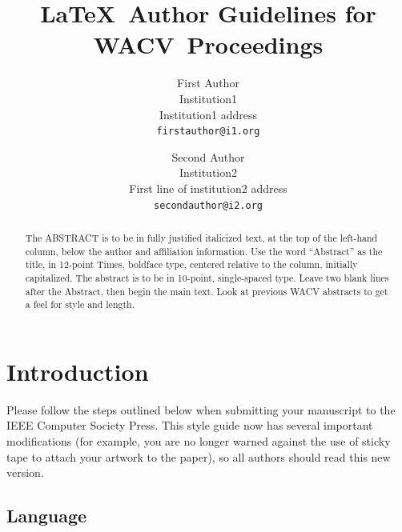 \documentclass[10pt,twocolumn,letterpaper]{article}
\def\confName{WACV}
\begin{document}
\title{\LaTeX\ Author Guidelines for \confName~Proceedings}

\author{First Author\\
Institution1\\
Institution1 address\\
{\tt\small firstauthor@i1.org}
\and
Second Author\\
Institution2\\
First line of institution2 address\\
{\tt\small secondauthor@i2.org}
}
\maketitle

\begin{abstract}
   The ABSTRACT is to be in fully justified italicized text, at the top of the left-hand column, below the author and affiliation information.
   Use the word ``Abstract'' as the title, in 12-point Times, boldface type, centered relative to the column, initially capitalized.
   The abstract is to be in 10-point, single-spaced type.
   Leave two blank lines after the Abstract, then begin the main text.
   Look at previous WACV abstracts to get a feel for style and length.
\end{abstract}

\section{Introduction}
\label{sec:intro}

Please follow the steps outlined below when submitting your manuscript to the IEEE Computer Society Press.
This style guide now has several important modifications (for example, you are no longer warned against the use of sticky tape to attach your artwork to the paper), so all authors should read this new version.

\subsection{Language}
\end{document}
